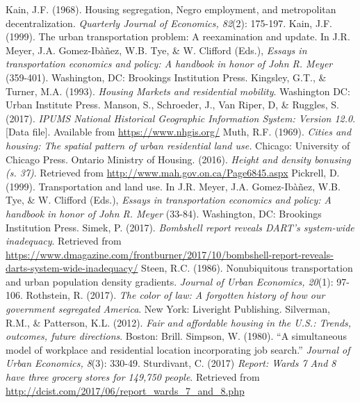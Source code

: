 \documentclass[paper=letter, fontsize=12pt]{scrartcl} %
\begin{document}
\begin{thebibliography}{9}
Kain, J.F. (1968). Housing segregation, Negro employment, and metropolitan decentralization. \textit{Quarterly Journal of Economics, 82}(2): 175-197.
Kain, J.F. (1999). The urban transportation problem: A reexamination and update. In J.R. Meyer, J.A. Gomez-Ib\`a\~nez, W.B. Tye, \& W. Clifford (Eds.), \textit{Essays in transportation economics and policy: A handbook in honor of John R. Meyer} (359-401). Washington, DC: Brookings Institution Press.
Kingsley, G.T., \& Turner, M.A. (1993). \textit{Housing Markets and residential mobility}. Washington DC: Urban Institute Press.
Manson, S., Schroeder, J., Van Riper, D, \& Ruggles, S. (2017). \textit{IPUMS National Historical Geographic Information System: Version 12.0}. [Data file]. Available from \href{https://www.nhgis.org/}{https://www.nhgis.org/}
Muth, R.F. (1969). \textit{Cities and housing: The spatial pattern of urban residential land use.} Chicago: University of Chicago Press.
Ontario Ministry of Housing. (2016). \textit{Height and density bonusing (s. 37)}. Retrieved from \href{http://www.mah.gov.on.ca/Page6845.aspx}{http://www.mah.gov.on.ca/Page6845.aspx}
Pickrell, D. (1999). Transportation and land use. In J.R. Meyer, J.A. Gomez-Ib\`a\~nez, W.B. Tye, \& W. Clifford (Eds.), \textit{Essays in transportation economics and policy: A handbook in honor of John R. Meyer} (33-84). Washington, DC: Brookings Institution Press.
Simek, P. (2017). \textit{Bombshell report reveals DART's system-wide inadequacy}. Retrieved from \href{https://www.dmagazine.com/frontburner/2017/10/bombshell-report-reveals-darts-system-wide-inadequacy/}{https://www.dmagazine.com/frontburner/2017/10/bombshell-report-reveals-darts-system-wide-inadequacy/}
Steen, R.C. (1986). Nonubiquitous transportation and urban population density gradients. \textit{Journal of Urban Economics, 20}(1): 97-106.
Rothstein, R. (2017). \textit{The color of law: A forgotten history of how our government segregated America}. New York: Liveright Publishing.
Silverman, R.M., \& Patterson, K.L. (2012). \textit{Fair and affordable housing in the U.S.: Trends, outcomes, future directions}. Boston: Brill.
Simpson, W. (1980). ``A simultaneous model of workplace and residential location incorporating job search.'' \textit{Journal of Urban Economics, 8}(3): 330-49.
Sturdivant, C. (2017) \textit{Report: Wards 7 And 8 have three grocery stores for 149,750 people}. Retrieved from \href{http://dcist.com/2017/06/report_wards_7_and_8.php}{http://dcist.com/2017/06/report\_wards\_7\_and\_8.php}

\end{thebibliography}
\end{document}
